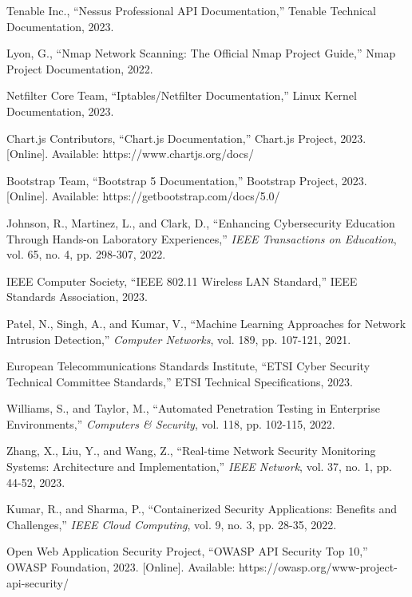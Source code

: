 \documentclass[12pt,a4paper]{report}
\begin{document}
\begin{thebibliography}{99}
Tenable Inc., ``Nessus Professional API Documentation,'' Tenable Technical Documentation, 2023.

Lyon, G., ``Nmap Network Scanning: The Official Nmap Project Guide,'' Nmap Project Documentation, 2022.

Netfilter Core Team, ``Iptables/Netfilter Documentation,'' Linux Kernel Documentation, 2023.

Chart.js Contributors, ``Chart.js Documentation,'' Chart.js Project, 2023. [Online]. Available: https://www.chartjs.org/docs/

Bootstrap Team, ``Bootstrap 5 Documentation,'' Bootstrap Project, 2023. [Online]. Available: https://getbootstrap.com/docs/5.0/

Johnson, R., Martinez, L., and Clark, D., ``Enhancing Cybersecurity Education Through Hands-on Laboratory Experiences,'' \textit{IEEE Transactions on Education}, vol. 65, no. 4, pp. 298-307, 2022.

IEEE Computer Society, ``IEEE 802.11 Wireless LAN Standard,'' IEEE Standards Association, 2023.

Patel, N., Singh, A., and Kumar, V., ``Machine Learning Approaches for Network Intrusion Detection,'' \textit{Computer Networks}, vol. 189, pp. 107-121, 2021.

European Telecommunications Standards Institute, ``ETSI Cyber Security Technical Committee Standards,'' ETSI Technical Specifications, 2023.

Williams, S., and Taylor, M., ``Automated Penetration Testing in Enterprise Environments,'' \textit{Computers \& Security}, vol. 118, pp. 102-115, 2022.

Zhang, X., Liu, Y., and Wang, Z., ``Real-time Network Security Monitoring Systems: Architecture and Implementation,'' \textit{IEEE Network}, vol. 37, no. 1, pp. 44-52, 2023.

Kumar, R., and Sharma, P., ``Containerized Security Applications: Benefits and Challenges,'' \textit{IEEE Cloud Computing}, vol. 9, no. 3, pp. 28-35, 2022.

Open Web Application Security Project, ``OWASP API Security Top 10,'' OWASP Foundation, 2023. [Online]. Available: https://owasp.org/www-project-api-security/

\end{thebibliography}
\end{document}
